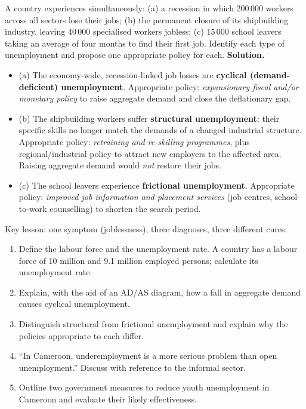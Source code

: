 \documentclass[11pt]{article}
\begin{document}
\begin{exoresolu}
A country experiences simultaneously: (a) a recession in which 200\,000 workers across all sectors lose their jobs; (b) the permanent closure of its shipbuilding industry, leaving 40\,000 specialised workers jobless; (c) 15\,000 school leavers taking an average of four months to find their first job. Identify each type of unemployment and propose one appropriate policy for each.
\tcblower
\textbf{Solution.}
\begin{itemize}
\item (a) The economy-wide, recession-linked job losses are \textbf{cyclical (demand-deficient) unemployment}. Appropriate policy: \emph{expansionary fiscal and/or monetary policy} to raise aggregate demand and close the deflationary gap.
\item (b) The shipbuilding workers suffer \textbf{structural unemployment}: their specific skills no longer match the demands of a changed industrial structure. Appropriate policy: \emph{retraining and re-skilling programmes}, plus regional/industrial policy to attract new employers to the affected area. Raising aggregate demand would \emph{not} restore their jobs.
\item (c) The school leavers experience \textbf{frictional unemployment}. Appropriate policy: \emph{improved job information and placement services} (job centres, school-to-work counselling) to shorten the search period.
\end{itemize}
Key lesson: one symptom (joblessness), three diagnoses, three different cures.
\end{exoresolu}

\begin{exercice}[Practice]
\begin{enumerate}
\item Define the labour force and the unemployment rate. A country has a labour force of 10 million and 9.1 million employed persons; calculate its unemployment rate.
\item Explain, with the aid of an AD/AS diagram, how a fall in aggregate demand causes cyclical unemployment.
\item Distinguish structural from frictional unemployment and explain why the policies appropriate to each differ.
\item ``In Cameroon, underemployment is a more serious problem than open unemployment.'' Discuss with reference to the informal sector.
\item Outline two government measures to reduce youth unemployment in Cameroon and evaluate their likely effectiveness.
\end{enumerate}
\end{exercice}
\end{document}

